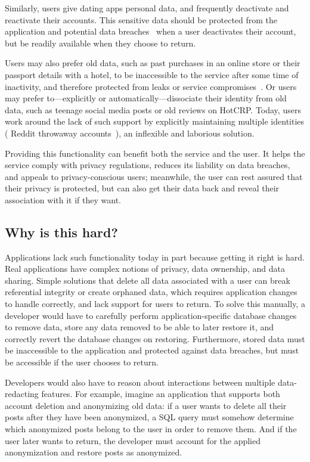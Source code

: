 Similarly, users give dating apps personal data, and frequently
deactivate and reactivate their accounts.
%
This sensitive data should be protected from the application and potential
data breaches~\cite{tinder, okcupid} when a user deactivates their account,
but be readily available when they choose to return.

Users may also prefer old data, such as past purchases in an online store or
their passport details with a hotel, to be inaccessible to the service after some
time of inactivity, and therefore protected from leaks or service
compromises~\cite{retention,breach:marriott}. Or users may prefer
to---explicitly or automatically---dissociate their identity from old data, such
as teenage social media posts or old reviews on HotCRP.
%
Today, users work around
the lack of such support by explicitly maintaining multiple identities (\eg
Reddit throwaway accounts~\cite{reddit:throwaway}), an inflexible and laborious
solution.
%

%
Providing this functionality can benefit both the service and the user.
%
It helps the service comply with privacy regulations, reduces its
liability on data breaches, and appeals to privacy-conscious users; meanwhile, the user can
rest assured that their privacy is protected, but can also get their data back and
reveal their association with it if they want.
%

\subsection{Why is this hard?}
%
Applications lack such functionality today in part because getting it right is hard.
%
Real applications have complex notions of privacy, data ownership, and
data sharing.
%
Simple solutions that \eg delete all data associated with a user can break referential
integrity or create orphaned data, which requires application changes to handle
correctly, and lack support for users to return.
%
To solve this manually, a developer would have to carefully perform
application-specific database changes to remove data, store any data removed
to be able to later restore it, and correctly revert
the database changes on restoring.
%
Furthermore, stored data must be inaccessible to the application and
protected against data breaches, but must be accessible if the user
chooses to return.
%

Developers would also have to reason about interactions between multiple
data-redacting features.
%
For example, imagine an application that supports
both account deletion and anonymizing old data: if
a user wants to delete all their posts after they have been anonymized, a
SQL query must somehow determine which anonymized posts belong to the user in
order to remove them.
%
And if the user later wants to return, the developer must
account for the applied anonymization and restore posts as anonymized.
%

